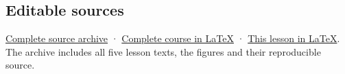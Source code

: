 \documentclass[
]{article}
\begin{document}
\subsection{Editable sources}\label{editable-sources}

\href{ideal-theory-in-rings-source.zip}{Complete source archive} ·
\href{ideal-theory-in-rings.tex}{Complete course in LaTeX} ·
\href{NOE-IDL-05.tex}{This lesson in LaTeX}. The archive includes all
five lesson texts, the figures and their reproducible source.
\end{document}
